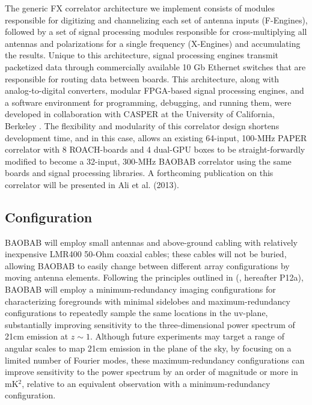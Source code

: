 \documentclass[10pt,iop]{emulateapj}
\begin{document}
The generic FX correlator architecture we implement consists of
modules responsible for digitizing and
channelizing each set of antenna inputs (F-Engines), followed by a set
of signal processing modules responsible for cross-multiplying all
antennas and polarizations for a single frequency (X-Engines) and
accumulating the results. 
Unique to this architecture, 
signal processing engines transmit packetized data through
commercially available 10 Gb Ethernet switches
that are responsible for routing data between boards.  This
architecture, along with analog-to-digital converters, modular
FPGA-based signal processing engines, and a software environment for
programming, debugging, and running them, were developed in
collaboration with CASPER at the University of California, Berkeley \citep{parsons_et_al_2008}.  
The flexibility and modularity of this correlator design
shortens development time, and in this case, allows an existing 64-input, 100-MHz
PAPER correlator with 8 ROACH-boards and 4 dual-GPU boxes
to be straight-forwardly modified to become a 32-input, 300-MHz BAOBAB correlator
using the same boards and signal processing libraries.  A forthcoming publication
on this correlator will be presented in Ali et al. (2013).
 
\subsection{Configuration}
 
BAOBAB will employ small antennas and above-ground cabling with relatively inexpensive 
LMR400 50-Ohm coaxial cables; these cables will not be buried, allowing BAOBAB
to easily change between different array configurations by moving antenna elements.
Following the principles outlined in
(\citealt{parsons_et_al_2012a}, hereafter P12a), BAOBAB will employ a minimum-redundancy imaging 
configurations for characterizing foregrounds with minimal sidelobes
and maximum-redundancy configurations to repeatedly
sample the same locations in the uv-plane, substantially improving sensitivity
to the three-dimensional power spectrum of 21cm emission at $z\sim1$.
Although future experiments may target a range of angular scales to map 21cm emission
in the plane of the sky, by focusing on a limited number of Fourier modes, 
these
maximum-redundancy configurations can improve sensitivity to the
power spectrum by an order of magnitude or more in mK$^2$, relative to an
equivalent observation with a minimum-redundancy configuration.
\end{document}
